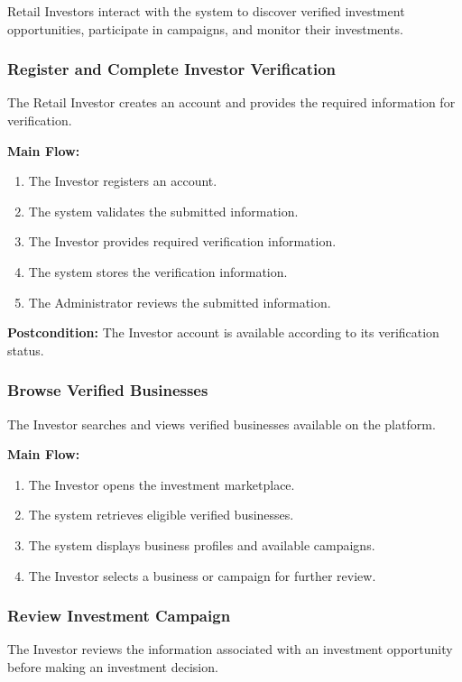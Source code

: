 Retail Investors interact with the system to discover verified investment
opportunities, participate in campaigns, and monitor their investments.

\subsubsection{Register and Complete Investor Verification}

The Retail Investor creates an account and provides the required information
for verification.

\textbf{Main Flow:}
\begin{enumerate}
    \item The Investor registers an account.
    \item The system validates the submitted information.
    \item The Investor provides required verification information.
    \item The system stores the verification information.
    \item The Administrator reviews the submitted information.
\end{enumerate}

\textbf{Postcondition:}
The Investor account is available according to its verification status.


\subsubsection{Browse Verified Businesses}

The Investor searches and views verified businesses available on the
platform.

\textbf{Main Flow:}
\begin{enumerate}
    \item The Investor opens the investment marketplace.
    \item The system retrieves eligible verified businesses.
    \item The system displays business profiles and available campaigns.
    \item The Investor selects a business or campaign for further review.
\end{enumerate}


\subsubsection{Review Investment Campaign}

The Investor reviews the information associated with an investment
opportunity before making an investment decision.

